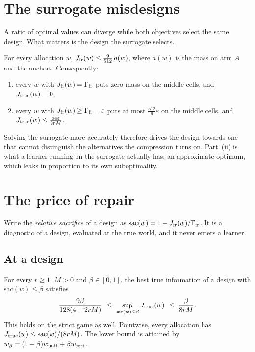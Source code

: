 \section{The surrogate misdesigns}
\label{sec:starve}

A ratio of optimal values can diverge while both objectives select the same design. What
matters is the design the surrogate selects.

\begin{theorem}[Starvation]
\label{thm:starve}
For every allocation $w$, $J_{\rm fr}(w)\le\frac{9}{512}\,a(w)$, where $a(w)$ is the mass on
arm $A$ and the anchors. Consequently:
\begin{enumerate}
\item[(i)] every $w$ with $J_{\rm fr}(w)=\Gamma_{\rm fr}$ puts zero mass on the middle cells,
and $J_{\rm true}(w)=0$;
\item[(ii)] every $w$ with $J_{\rm fr}(w)\ge\Gamma_{\rm fr}-\varepsilon$ puts at most
$\frac{512}{9}\varepsilon$ on the middle cells, and $J_{\rm true}(w)\le\frac{64\varepsilon}{9rM}$.
\end{enumerate}
\end{theorem}


Solving the surrogate more accurately therefore drives the design towards one that cannot
distinguish the alternatives the compression turns on. Part~(ii) is what a learner running on
the surrogate actually has: an approximate optimum, which leaks in proportion to its own
suboptimality.

\section{The price of repair}
\label{sec:repair}

Write the \emph{relative sacrifice} of a design as
$\mathrm{sac}(w)=1-J_{\rm fr}(w)/\Gamma_{\rm fr}$. It is a diagnostic of a design, evaluated at
the true world, and it never enters a learner.

\subsection{At a design}

\begin{theorem}
\label{thm:frontier}
For every $r\ge1$, $M>0$ and $\beta\in[0,1]$, the best true information of a design with
$\mathrm{sac}(w)\le\beta$ satisfies
\[
\frac{9\beta}{128(4+2rM)}\ \le\ \sup_{\mathrm{sac}(w)\le\beta}J_{\rm true}(w)\ \le\
\frac{\beta}{8rM}.
\]
This holds on the strict game as well. Pointwise, every allocation has
$J_{\rm true}(w)\le\mathrm{sac}(w)/(8rM)$. The lower bound is attained by
$w_{\beta}=(1-\beta)w_{\rm unif}+\beta w_{\rm cert}$.
\end{theorem}

